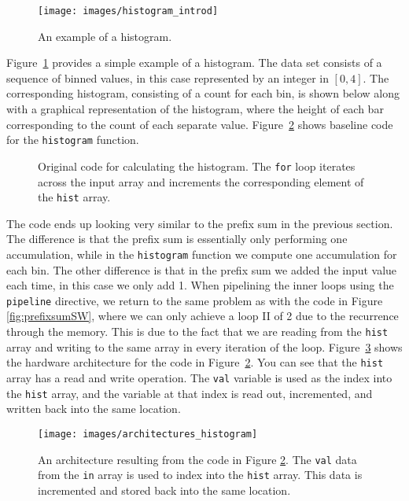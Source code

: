 \begin{figure}
\centering
\texttt{[image: images/histogram\_introd]}
\caption{ An example of a histogram.  }
\label{fig:histogram_introd}
\end{figure}

Figure~\ref{fig:histogram_introd} provides a simple example of a histogram.  The data set consists of a sequence of binned values, in this case represented by an integer in $[0,4]$. The corresponding histogram, consisting of a count for each bin, is shown below along with a graphical representation of the histogram, where the height of each bar corresponding to the count of each separate value.  Figure~\ref{fig:histogramSW} shows baseline code for the \lstinline{histogram} function.

\begin{figure}
{\footnotesize }
\caption{ Original code for calculating the histogram. The \lstinline{for} loop iterates across the input array and increments the corresponding element of the \lstinline{hist} array. }
\label{fig:histogramSW}
\end{figure}

The code ends up looking very similar to the prefix sum in the previous section.  The difference is that the prefix sum is essentially only performing one accumulation, while in the \lstinline|histogram| function we compute one accumulation for each bin.  The other difference is that in the prefix sum we added the input value each time, in this case we only add 1.  When pipelining the inner loops using the \lstinline|pipeline| directive, we return to the same problem as with the code in Figure \ref{fig:prefixsumSW}, where we can only achieve a loop II of 2 due to the recurrence through the memory.   This is due to the fact that we are reading from the \lstinline{hist} array and writing to the same array in every iteration of the loop.  
Figure~\ref{fig:architecture_histogram} shows the hardware architecture for the code in Figure~\ref{fig:histogramSW}. You can see that the \lstinline{hist} array has a read and write operation. The \lstinline{val} variable is used as the index into the \lstinline{hist} array, and the variable at that index is read out, incremented, and written back into the same location.

\begin{figure}
\centering
\texttt{[image: images/architectures\_histogram]}
\caption{ An architecture resulting from the code in Figure \ref{fig:histogramSW}. The \lstinline{val} data from the \lstinline{in} array is used to index into the \lstinline{hist} array. This data is incremented and stored back into the same location.}
\label{fig:architecture_histogram}
\end{figure}

